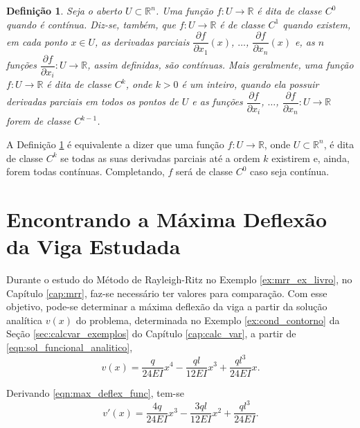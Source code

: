 \documentclass[
	12pt,				%
	openright,			%
    twoside,			%
	a4paper,			%
	english,			%
	french,				%
	spanish,			%
	brazil				%
	]{abntex2}
\newtheorem{definicao}{Definição}
\numberwithin{lema}{chapter}
\numberwithin{teorema}{chapter}
\numberwithin{definicao}{chapter}
\numberwithin{exemplo}{chapter}
\numberwithin{figure}{chapter}
\begin{document}
\begin{apendicesenv}
{	\begin{definicao}
		\label{def:cap_conceitos_analise:classe_ck}
		Seja o aberto $U\subset\mathbb{R}^n$. Uma função $f:U\longrightarrow\mathbb{R}$ é dita de classe $C^0$ quando é contínua. Diz-se, também, que $f:U\longrightarrow\mathbb{R}$ é de classe $C^1$ quando existem, em cada ponto $x\in U$, as derivadas parciais $\dfrac{\partial f}{\partial x_1}(x)$, $\dots$, $\dfrac{\partial f}{\partial x_n}(x)$ e, as $n$ funções $\dfrac{\partial f}{\partial x_i}:U\longrightarrow \mathbb{R}$, assim definidas, são contínuas. Mais geralmente, uma função $f:U\longrightarrow\mathbb{R}$ é dita de classe $C^k$, onde $k>0$ é um inteiro, quando ela possuir derivadas parciais em todos os pontos de $U$ e as funções $\dfrac{\partial f}{\partial x_i}$, $\dots$, $\dfrac{\partial f}{\partial x_n}:U\longrightarrow \mathbb{R}$ forem de classe $C^{k-1}$.
	\end{definicao}
	
	A Definição \ref{def:cap_conceitos_analise:classe_ck} é equivalente a dizer que uma função $f:U\longrightarrow\mathbb{R}$, onde $U\subset\mathbb{R}^n$, é dita de classe $C^k$ se todas as suas derivadas parciais até a ordem $k$ existirem e, ainda, forem todas contínuas. Completando, $f$ será de classe $C^0$ caso seja contínua.
}

\chapter{Encontrando a Máxima Deflexão da Viga Estudada}
\label{apend:max_deflex}
{
	Durante o estudo do Método de Rayleigh-Ritz no Exemplo \ref{ex:mrr_ex_livro}, no Capítulo \ref{cap:mrr}, faz-se necessário ter valores para comparação. Com esse objetivo, pode-se determinar a máxima deflexão da viga a partir da solução analítica $v(x)$ do problema, determinada no Exemplo \ref{ex:cond_contorno} da Seção \ref{sec:calcvar_exemplos} do Capítulo \ref{cap:calc_var}, a partir de \eqref{eqn:sol_funcional_analitico},
	\begin{equation}
	\label{eqn:max_deflex_func}
	v(x) = 
		\frac{q}{24EI} x^4
		-
		\frac{ql}{12EI} x^3
		+
		\frac{ql^3}{24EI} x
		\text{.}
	\end{equation}
	
	Derivando \eqref{eqn:max_deflex_func}, tem-se
	\begin{equation}
	\label{eqn:max_deflex_func_diff}
	v'(x) =
		\frac{4q}{24EI}x^3
		-
		\frac{3ql}{12EI}x^2
		+
		\frac{ql^3}{24EI}
		\text{.}
	\end{equation}
	
}
\end{apendicesenv}
\end{document}
